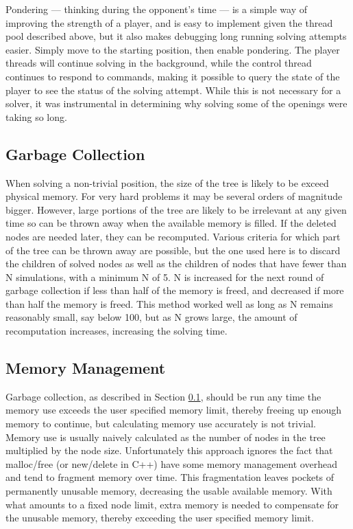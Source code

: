 Pondering --- thinking during the opponent's time --- is a simple way of improving the strength of a player, and is easy to implement given the thread pool described above, but it also makes debugging long running solving attempts easier. Simply move to the starting position, then enable pondering. The player threads will continue solving in the background, while the control thread continues to respond to commands, making it possible to query the state of the player to see the status of the solving attempt. While this is not necessary for a solver, it was instrumental in determining why solving some of the openings were taking so long.


\subsection{Garbage Collection}\label{sec:gc}

When solving a non-trivial position, the size of the tree is likely to be exceed physical memory. For very hard problems it may be several orders of magnitude bigger. However, large portions of the tree are likely to be irrelevant at any given time so can be thrown away when the available memory is filled. If the deleted nodes are needed later, they can be recomputed. Various criteria for which part of the tree can be thrown away are possible, but the one used here is to discard the children of solved nodes as well as the children of nodes that have fewer than N simulations, with a minimum N of 5. N is increased for the next round of garbage collection if less than half of the memory is freed, and decreased if more than half the memory is freed. This method worked well as long as N remains reasonably small, say below 100, but as N grows large, the amount of recomputation increases, increasing the solving time.


\subsection{Memory Management}

Garbage collection, as described in Section \ref{sec:gc}, should be run any time the memory use exceeds the user specified memory limit, thereby freeing up enough memory to continue, but calculating memory use accurately is not trivial. Memory use is usually naively calculated as the number of nodes in the tree multiplied by the node size. Unfortunately this approach ignores the fact that malloc/free (or new/delete in C++) have some memory management overhead and tend to fragment memory over time. This fragmentation leaves pockets of permanently unusable memory, decreasing the usable available memory. With what amounts to a fixed node limit, extra memory is needed to compensate for the unusable memory, thereby exceeding the user specified memory limit.

